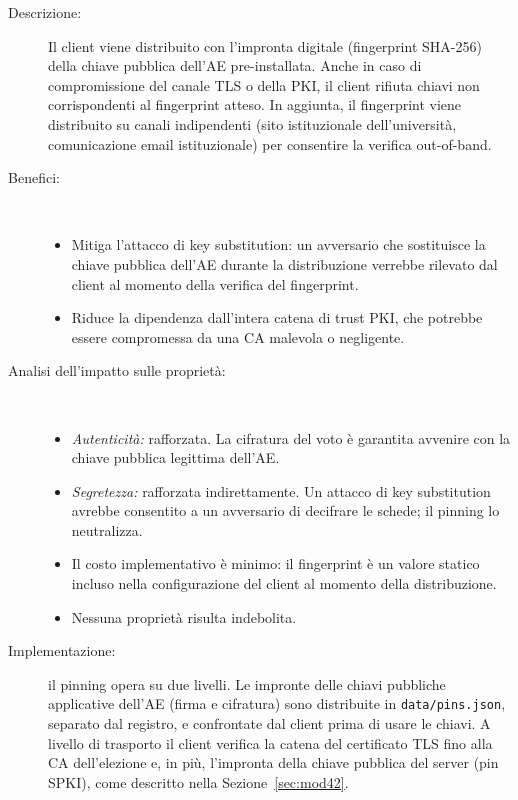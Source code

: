 \documentclass[12pt,a4paper]{article}
\begin{document}
\begin{description}
  \item[Descrizione:] Il client viene distribuito con l'impronta digitale (fingerprint SHA-256) della chiave pubblica dell'AE pre-installata. Anche in caso di compromissione del canale TLS o della PKI, il client rifiuta chiavi non corrispondenti al fingerprint atteso. In aggiunta, il fingerprint viene distribuito su canali indipendenti (sito istituzionale dell'università, comunicazione email istituzionale) per consentire la verifica out-of-band.
  \item[Benefici:] \
    \begin{itemize}
      \item Mitiga l'attacco di key substitution: un avversario che sostituisce la chiave pubblica dell'AE durante la distribuzione verrebbe rilevato dal client al momento della verifica del fingerprint.
      \item Riduce la dipendenza dall'intera catena di trust PKI, che potrebbe essere compromessa da una CA malevola o negligente.
    \end{itemize}
  \item[Analisi dell'impatto sulle proprietà:] \
    \begin{itemize}
      \item \textit{Autenticità:} rafforzata. La cifratura del voto è garantita avvenire con la chiave pubblica legittima dell'AE.
      \item \textit{Segretezza:} rafforzata indirettamente. Un attacco di key substitution avrebbe consentito a un avversario di decifrare le schede; il pinning lo neutralizza.
      \item Il costo implementativo è minimo: il fingerprint è un valore statico incluso nella configurazione del client al momento della distribuzione.
      \item Nessuna proprietà risulta indebolita.
    \end{itemize}
  \item[Implementazione:] il pinning opera su due livelli. Le impronte delle chiavi pubbliche applicative dell'AE (firma e cifratura) sono distribuite in \texttt{data/pins.json}, separato dal registro, e confrontate dal client prima di usare le chiavi. A livello di trasporto il client verifica la catena del certificato TLS fino alla CA dell'elezione e, in più, l'impronta della chiave pubblica del server (pin SPKI), come descritto nella Sezione~\ref{sec:mod42}.
\end{description}
\end{document}
